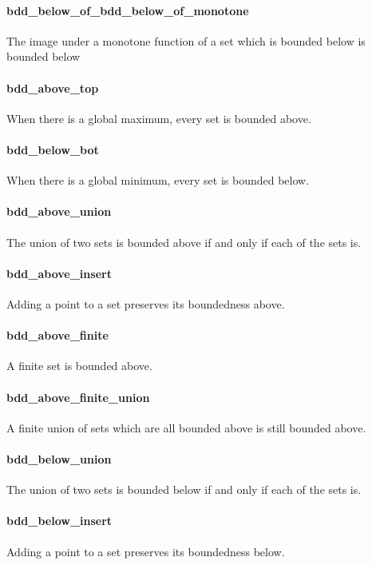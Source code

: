 \documentclass{article}
\begin{document}
\paragraph{bdd\_below\_of\_bdd\_below\_of\_monotone}
\par
The image under a monotone function of a set which is bounded below is bounded below
\paragraph{bdd\_above\_top}
\par
When there is a global maximum, every set is bounded above.
\paragraph{bdd\_below\_bot}
\par
When there is a global minimum, every set is bounded below.
\paragraph{bdd\_above\_union}
\par
The union of two sets is bounded above if and only if each of the sets is.
\paragraph{bdd\_above\_insert}
\par
Adding a point to a set preserves its boundedness above.
\paragraph{bdd\_above\_finite}
\par
A finite set is bounded above.
\paragraph{bdd\_above\_finite\_union}
\par
A finite union of sets which are all bounded above is still bounded above.
\paragraph{bdd\_below\_union}
\par
The union of two sets is bounded below if and only if each of the sets is.
\paragraph{bdd\_below\_insert}
\par
Adding a point to a set preserves its boundedness below.
\end{document}
